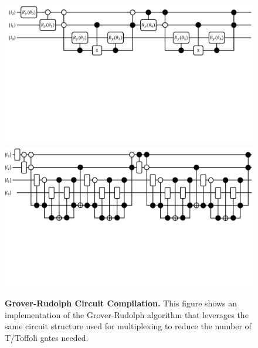 \begin{figure}
    \centering
    \includegraphics[width=16cm]{figures/grover-rudolph.pdf}
    \includegraphics[width=16cm]{figures/grover-rudolph-4-qubits.pdf}
    \caption{
        \textbf{Grover-Rudolph Circuit Compilation.} 
        This figure shows an implementation of the Grover-Rudolph algorithm that leverages the same circuit structure used for multiplexing to reduce the number of T/Toffoli gates needed.
    }
    \label{fig:grover-rudolph}
\end{figure}

